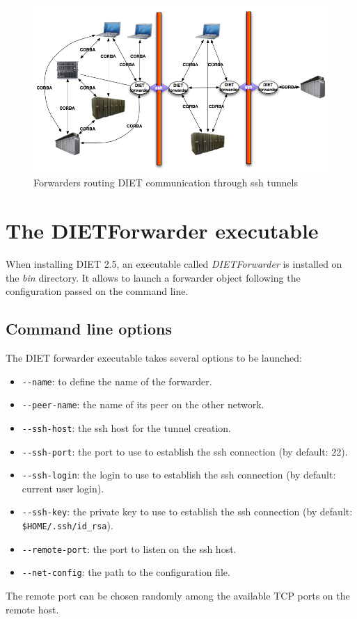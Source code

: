 \begin{figure}[htp]
\begin{center}
  \includegraphics[width=12cm]{fig/Forwarder}
\end{center}
\caption{Forwarders routing DIET communication through ssh tunnels
  \label{fig:forwarder}}
\end{figure}

\section{The DIETForwarder executable}
\label{sec:ForwarderConfig}
When installing DIET 2.5, an executable called \textit{DIETForwarder}
is installed on the \textit{bin} directory. It allows to launch a
forwarder object following the configuration passed on the command
line.
\subsection{Command line options}
The DIET forwarder executable takes several options to be launched:
\begin{itemize}
\item \verb#--name#: to define the name of the forwarder.
\item \verb#--peer-name#: the name of its peer on the other network.
\item \verb#--ssh-host#: the ssh host for the tunnel creation.
\item \verb#--ssh-port#: the port to use to establish the ssh
  connection (by default: 22).
\item \verb#--ssh-login#: the login to use to establish the ssh
  connection (by default: current user login).
\item \verb#--ssh-key#: the private key to use to establish the ssh
  connection (by default: \verb#$HOME/.ssh/id_rsa#).
\item \verb#--remote-port#: the port to listen on the ssh host.
\item \verb#--net-config#: the path to the configuration file.
\end{itemize}
The remote port can be chosen randomly among the available TCP ports
on the remote host.\\

